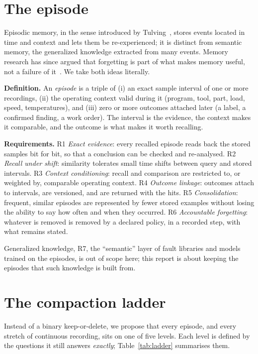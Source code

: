 \documentclass[sigconf,nonacm]{acmart}
\begin{document}
\section{The episode}\label{sec:episode}
Episodic memory, in the sense introduced by Tulving~\cite{tulving1972}, stores events located in time and context and lets them be re-experienced; it is distinct from semantic memory, the generalized knowledge extracted from many events. Memory research has since argued that forgetting is part of what makes memory useful, not a failure of it~\cite{richards2017}. We take both ideas literally.

\textbf{Definition.} An \emph{episode} is a triple of (i) an exact sample interval of one or more recordings, (ii) the operating context valid during it (program, tool, part, load, speed, temperatures), and (iii) zero or more outcomes attached later (a label, a confirmed finding, a work order). The interval is the evidence, the context makes it comparable, and the outcome is what makes it worth recalling.

\textbf{Requirements.} R1 \emph{Exact evidence}: every recalled episode reads back the stored samples bit for bit, so that a conclusion can be checked and re-analysed. R2 \emph{Recall under shift}: similarity tolerates small time shifts between query and stored intervals. R3 \emph{Context conditioning}: recall and comparison are restricted to, or weighted by, comparable operating context. R4 \emph{Outcome linkage}: outcomes attach to intervals, are versioned, and are returned with the hits. R5 \emph{Consolidation}: frequent, similar episodes are represented by fewer stored examples without losing the ability to say how often and when they occurred. R6 \emph{Accountable forgetting}: whatever is removed is removed by a declared policy, in a recorded step, with what remains stated.

Generalized knowledge, R7, the ``semantic'' layer of fault libraries and models trained on the episodes, is out of scope here; this report is about keeping the episodes that such knowledge is built from.

\section{The compaction ladder}\label{sec:ladder}
Instead of a binary keep-or-delete, we propose that every episode, and every stretch of continuous recording, sits on one of five levels. Each level is defined by the questions it still answers \emph{exactly}; Table~\ref{tab:ladder} summarises them.
\end{document}
